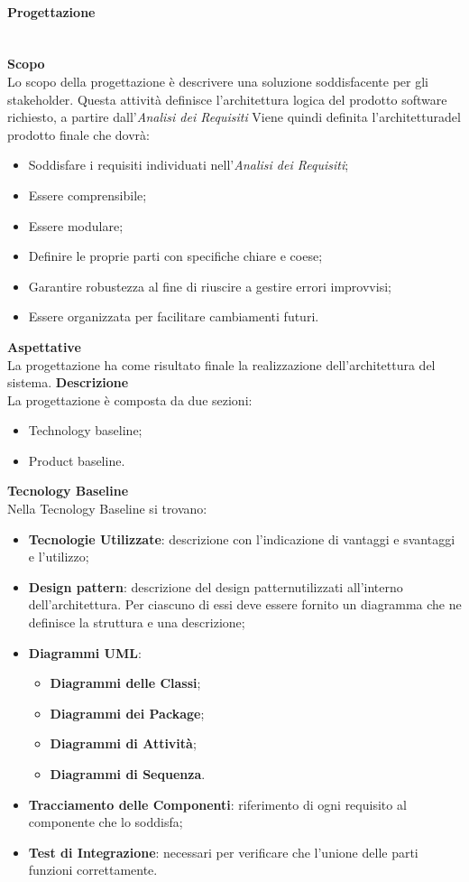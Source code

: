 \paragraph{Progettazione}\mbox{}\\ [1mm]
\textbf{Scopo}\\
Lo scopo della progettazione è descrivere una soluzione soddisfacente per gli stakeholder\glo. Questa attività definisce l'architettura logica del prodotto software richiesto, a partire dall'\textit{Analisi dei Requisiti}
Viene quindi definita l'architettura\glosp del prodotto finale che dovrà:
\begin{itemize}
	\item Soddisfare i requisiti individuati nell'\textit{Analisi dei Requisiti};
	\item Essere comprensibile;
	\item Essere modulare;
	\item Definire le proprie parti con specifiche chiare e coese;
	\item Garantire robustezza al fine di riuscire a gestire errori improvvisi;
	\item Essere organizzata per facilitare cambiamenti futuri.
\end{itemize}
\textbf{Aspettative}\\
La progettazione ha come risultato finale la realizzazione dell'architettura del sistema.
\textbf{Descrizione}\\
La progettazione è composta da due sezioni:
\begin{itemize}
	\item Technology baseline;
	\item Product baseline.	
\end{itemize}
\textbf{Tecnology Baseline}\\
Nella Tecnology Baseline si trovano:
\begin{itemize}
	\item \textbf{Tecnologie Utilizzate}: descrizione con l'indicazione di vantaggi e svantaggi e l'utilizzo;
	\item \textbf{Design pattern\glo}: descrizione del design pattern\glosp utilizzati all'interno dell'architettura. Per ciascuno di essi deve essere fornito un diagramma che ne definisce la struttura e una descrizione;
	\item \textbf{Diagrammi UML}:
	\begin{itemize}
		\item \textbf{Diagrammi delle Classi};
		\item \textbf{Diagrammi dei Package};
		\item \textbf{Diagrammi di Attività};
		\item \textbf{Diagrammi di Sequenza}.
	\end{itemize}
	\item \textbf{Tracciamento delle Componenti}: riferimento di ogni requisito al componente che lo soddisfa;
	\item \textbf{Test di Integrazione}: necessari per verificare che l'unione delle parti funzioni correttamente.
\end{itemize}
